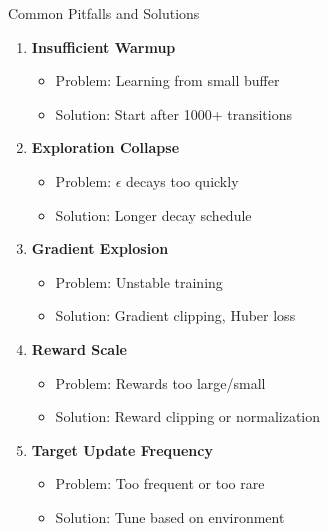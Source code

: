 \documentclass[aspectratio=169,10pt]{beamer}
\begin{document}
\begin{frame}{Common Pitfalls and Solutions}
\begin{enumerate}
    \item \textbf{Insufficient Warmup}
    \begin{itemize}
        \item Problem: Learning from small buffer
        \item Solution: Start after 1000+ transitions
    \end{itemize}
    
    \item \textbf{Exploration Collapse}
    \begin{itemize}
        \item Problem: $\epsilon$ decays too quickly
        \item Solution: Longer decay schedule
    \end{itemize}
    
    \item \textbf{Gradient Explosion}
    \begin{itemize}
        \item Problem: Unstable training
        \item Solution: Gradient clipping, Huber loss
    \end{itemize}
    
    \item \textbf{Reward Scale}
    \begin{itemize}
        \item Problem: Rewards too large/small
        \item Solution: Reward clipping or normalization
    \end{itemize}
    
    \item \textbf{Target Update Frequency}
    \begin{itemize}
        \item Problem: Too frequent or too rare
        \item Solution: Tune based on environment
    \end{itemize}
\end{enumerate}
\end{frame}
\end{document}
